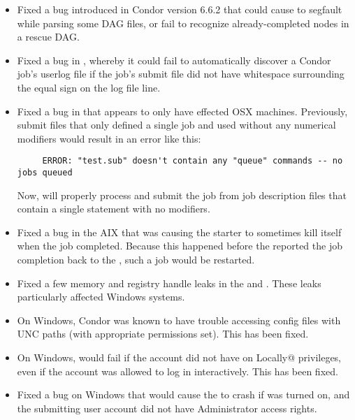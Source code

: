 \begin{itemize}

\item Fixed a bug introduced in Condor version 6.6.2 that could cause
       to segfault while parsing some DAG files, or
      fail to recognize already-completed nodes in a rescue DAG.

\item Fixed a bug in , whereby it could fail to
      automatically discover a Condor job's userlog file if the job's
      submit file did not have whitespace surrounding the equal sign
      on the log file line.

\item Fixed a bug in  that appears to only have
  effected OSX machines.
  Previously, submit files that only defined a single job and used
  \verb@queue@ without any numerical modifiers would result in an
  error like this: 
\footnotesize
\begin{verbatim}
     ERROR: "test.sub" doesn't contain any "queue" commands -- no jobs queued
\end{verbatim}
\normalsize
  Now,  will properly process and submit the job from
  job description files that contain a single \verb@queue@ statement
  with no modifiers.

\item Fixed a bug in the AIX  that was causing the
starter to sometimes kill itself when the job completed.  Because this
happened before the  reported the job completion back
to the , such a job would be restarted.

\item Fixed a few memory and registry handle leaks in the 
and . These leaks particularly affected Windows systems.

\item On Windows, Condor was known to have trouble accessing config files
with UNC paths (with appropriate permissions set). This has been fixed.

\item On Windows,  would fail if the account did not
have \verb@Log on Locally@ privileges, even if the account was allowed
to log in interactively. This has been fixed.

\item Fixed a bug on Windows that would cause the  to
crash if  was turned on, and the submitting user
account did not have Administrator access rights.

\end{itemize}

